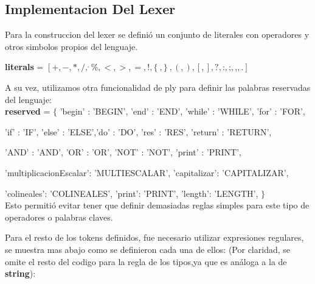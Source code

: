 \subsection{Implementacion Del Lexer}

Para la construccion del lexer se definió un conjunto de literales con operadores y otros simbolos propios del lenguaje.

\textbf{literals} = $[+,- , * , / , ^ ,\% , < , > , = , ! , \{\ , \}\ , ( , ) , [ , ] , ? , \textbf{:} , \textbf{;} , \textbf{,} , \textbf{.} ]$

A su vez, utilizamos otra funcionalidad de ply para definir las palabras reservadas del lenguaje: \\

\textbf{reserved} = $\{$
'begin' : 'BEGIN', 'end' : 'END', 'while' : 'WHILE', 'for' : 'FOR',

'if' : 'IF', 'else' : 'ELSE','do' : 'DO', 'res' : 'RES', 'return' : 'RETURN',

'AND' : 'AND', 'OR' : 'OR', 'NOT' : 'NOT', 'print' : 'PRINT',

'multiplicacionEscalar': 'MULTIESCALAR', 'capitalizar': 'CAPITALIZAR', 

'colineales': 'COLINEALES', 'print': 'PRINT', 'length': 'LENGTH',
$\}$ \\

Esto permitió evitar tener que definir demasiadas reglas simples para este tipo de operadores o palabras claves.

Para el resto de los tokens definidos, fue necesario utilizar expresiones regulares, se muestra mas abajo como se definieron cada una de ellos: (Por claridad, se omite el resto del codigo para la regla de los tipos,ya que  es análoga a la de \textbf{string}):

